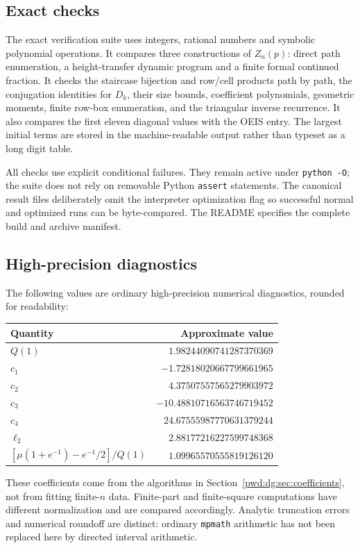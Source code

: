 \documentclass[11pt,letterpaper]{article}
\numberwithin{equation}{section}
\theoremstyle{remark}\newtheorem{remark}[theorem]{Remark}
\begin{document}
\subsection{Exact checks}
The exact verification suite uses integers, rational numbers and symbolic polynomial operations. It compares three constructions of $Z_n(p)$: direct path enumeration, a height-transfer dynamic program and a finite formal continued fraction. It checks the staircase bijection and row/cell products path by path, the conjugation identities for $D_k$, their size bounds, coefficient polynomials, geometric moments, finite row-box enumeration, and the triangular inverse recurrence. It also compares the first eleven diagonal values with the OEIS entry. The largest initial terms are stored in the machine-readable output rather than typeset as a long digit table.

All checks use explicit conditional failures. They remain active under \texttt{python -O}; the suite does not rely on removable Python \texttt{assert} statements. The canonical result files deliberately omit the interpreter optimization flag so successful normal and optimized runs can be byte-compared. The README specifies the complete build and archive manifest.

\subsection{High-precision diagnostics}
The following values are ordinary high-precision numerical diagnostics, rounded for readability:
\begin{center}
\begin{tabular}{@{}lr@{}}\toprule
Quantity & Approximate value\\\midrule
$Q(1)$ & $1.98244090741287370369$\\
$c_1$ & $-1.72818020667799661965$\\
$c_2$ & $4.37507557565279903972$\\
$c_3$ & $-10.48810716563746719452$\\
$c_4$ & $24.67555987770631379244$\\
$\ell_2$ & $2.88177216227599748368$\\
$[\mu(1+e^{-1})-e^{-1}/2]/Q(1)$ & $1.09965570555819126120$\\\bottomrule
\end{tabular}
\end{center}
These coefficients come from the algorithms in Section~\ref{pwd:dg:sec:coefficients}, not from fitting finite-$n$ data. Finite-part and finite-square computations have different normalization and are compared accordingly. Analytic truncation errors and numerical roundoff are distinct: ordinary \texttt{mpmath} arithmetic has not been replaced here by directed interval arithmetic.
\end{document}
